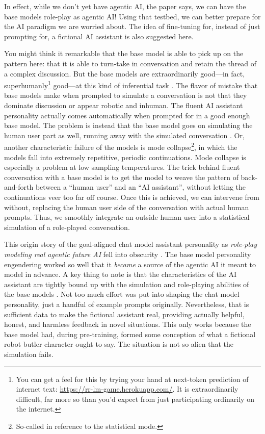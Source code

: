 In effect, while we don't yet have agentic AI, the paper says, we can have the
base models role-play as agentic AI! Using that testbed, we can better prepare
for the AI paradigm we are worried about. The idea of fine-tuning for, instead
of just prompting for, a fictional AI assistant is also suggested here.

You might think it remarkable that the base model is able to pick up on the
pattern here: that it is able to turn-take in conversation and retain the
thread of a complex discussion. But the base models are extraordinarily
good---in fact, superhumanly\footnote{You can get a feel for this by trying
your hand at next-token prediction of internet text:
\url{https://rr-lm-game.herokuapp.com/}. It is extraordinarily difficult, far
more so than you'd expect from just participating ordinarily on the internet.}
good---at this kind of inferential task \cite{shlegeris2024better}. The flavor
of mistake that base models make when prompted to simulate a conversation is
not that they dominate discussion or appear robotic and inhuman. The fluent AI
assistant personality actually comes automatically when prompted for in a good
enough base model. The problem is instead that the base model goes on
simulating the human user part as well, running away with the simulated
conversation \cite{edwards2024voice}. Or, another characteristic failure of the
models is mode collapse\footnote{So-called in reference to the statistical
mode.}, in which the models fall into extremely repetitive, periodic
continuations. Mode collapse is especially a problem at low sampling
temperatures. The trick behind fluent conversation with a base model is to get
the model to weave the pattern of back-and-forth between a ``human user'' and
an ``AI assistant'', without letting the continuations veer too far off course.
Once this is achieved, we can intervene from without, replacing the human user
side of the conversation with actual human prompts. Thus, we smoothly integrate
an outside human user into a statistical simulation of a role-played
conversation.

This origin story of the goal-aligned chat model assistant personality as
\emph{role-play modeling real agentic future AI} fell into obscurity
\cite{nostalgebraist2025void}. The base model personality engendering worked so
well that it \emph{became} a source of the agentic AI it meant to model in
advance. A key thing to note is that the characteristics of the AI assistant
are tightly bound up with the simulation and role-playing abilities of the base
models \cite{nostalgebraist2025void}. Not too much effort was put into shaping
the chat model personality, just a handful of example prompts originally.
Nevertheless, that is sufficient data to make the fictional assistant real,
providing actually helpful, honest, and harmless feedback in novel situations.
This only works because the base model had, during pre-training, formed some
conception of what a fictional robot butler character ought to say. The
situation is not so alien that the simulation fails.

